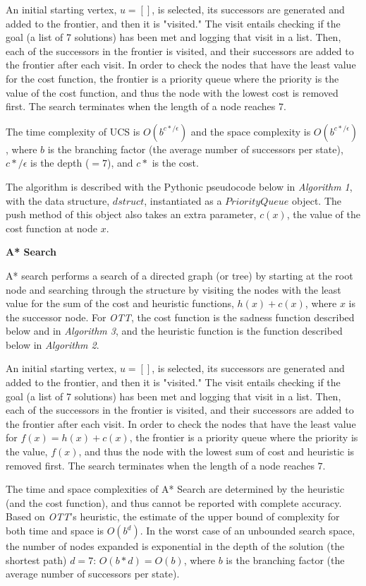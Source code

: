 \documentclass[11pt]{article}
\begin{document}
An initial starting vertex, $u = []$, is selected, its successors are generated and added to the frontier, and then it is "visited." The visit entails checking if the goal (a list of 7 solutions) has been met and logging that visit in a list. Then, each of the successors in the frontier is visited, and their successors are added to the frontier after each visit. In order to check the nodes that have the least value for the cost function, the frontier is a priority queue where the priority is the value of the cost function, and thus the node with the lowest cost is removed first. The search terminates when the length of a node reaches $7$.

The time complexity of UCS is $O(b^{c*/\epsilon})$ and the space complexity is $O(b^{c*/\epsilon})$, where $b$ is the branching factor (the average number of successors per state), $c*/\epsilon$ is the depth ($=7$), and $c*$ is the cost.

The algorithm is described with the Pythonic pseudocode below in \emph{Algorithm 1}, with the data structure, $dstruct$, instantiated as a $PriorityQueue$ object. The push method of this object also takes an extra parameter, $c(x)$, the value of the cost function at node $x$.

\medskip

\textbf{A* Search}

A* search performs a search of a directed graph (or tree) by starting at the root node and searching through the structure by visiting the nodes with the least value for the sum of the cost and heuristic functions, $h(x) + c(x)$, where $x$ is the successor node. For \emph{OTT}, the cost function is the sadness function described below and in \emph{Algorithm 3}, and the heuristic function is the function described below in \emph{Algorithm 2}.

An initial starting vertex, $u = []$, is selected, its successors are generated and added to the frontier, and then it is "visited." The visit entails checking if the goal (a list of 7 solutions) has been met and logging that visit in a list. Then, each of the successors in the frontier is visited, and their successors are added to the frontier after each visit. In order to check the nodes that have the least value for $f(x) = h(x) + c(x)$, the frontier is a priority queue where the priority is the value, $f(x)$, and thus the node with the lowest sum of cost and heuristic is removed first. The search terminates when the length of a node reaches $7$.

The time and space complexities of A* Search are determined by the heuristic (and the cost function), and thus cannot be reported with complete accuracy. Based on \emph{OTT}'s heuristic, the estimate of the upper bound of complexity for both time and space is $O(b^d)$. In the worst case of an unbounded search space, the number of nodes expanded is exponential in the depth of the solution (the shortest path) $d=7$: $O(b*d) = O(b)$, where $b$ is the branching factor (the average number of successors per state).\cite{astar}
\end{document}
